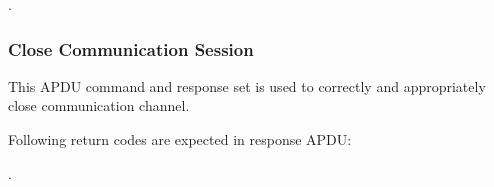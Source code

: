 .\begin{table}[!htb]
\caption{Trigger Session Return Code}
\label{trigger-session-response-apdu}
\end{table}


\subsubsection{Close Communication Session}\label{secSessionClose}
This APDU command and response set is used to correctly and appropriately close communication channel.


\begin{table}[!htb]
\caption{Close Session command APDU}
\label{close-session-apdu}
\end{table}

Following return codes are expected in response APDU:

.\begin{table}[!htb]
\caption{Close Session Return Code}
\label{close-session-response-apdu}
\end{table}

